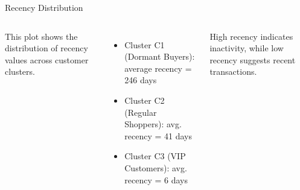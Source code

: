 \documentclass[aspectratio=169, table]{beamer}
\begin{document}
\begin{frame}{Recency Distribution}
	\vspace{20pt}
	\begin{columns}[c]
		\small
		This plot shows the distribution of recency values across customer clusters.  
		\begin{itemize}
			\item Cluster C1 (Dormant Buyers): average recency = 246 days  
			\item Cluster C2 (Regular Shoppers): avg. recency = 41 days  
			\item Cluster C3 (VIP Customers): avg. recency = 6 days  
		\end{itemize}
		High recency indicates inactivity, while low recency suggests recent transactions.
		
		\centering
	\end{columns}
\end{frame}
\end{document}
